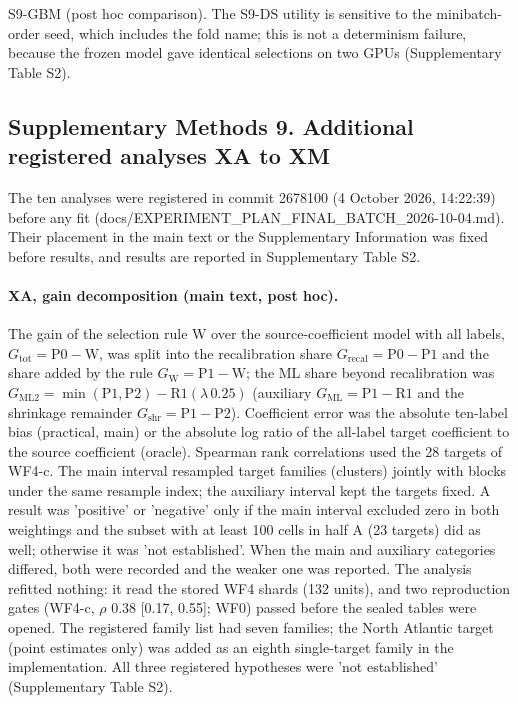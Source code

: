 S9-GBM (post hoc comparison). The S9-DS utility is sensitive to the minibatch-order seed, which includes the fold name; this is not a determinism failure, because the frozen model gave identical selections on two GPUs (Supplementary Table S2).

\subsection*{Supplementary Methods 9. Additional registered analyses XA to XM}

The ten analyses were registered in commit 2678100 (4 October 2026, 14:22:39) before any fit (docs/EXPERIMENT\_PLAN\_FINAL\_BATCH\_2026-10-04.md). Their placement in the main text or the Supplementary Information was fixed before results, and results are reported in Supplementary Table S2.

\paragraph*{XA, gain decomposition (main text, post hoc).} The gain of the selection rule W over the source-coefficient model with all labels, $G_{\mathrm{tot}} = \mathrm{P0} - \mathrm{W}$, was split into the recalibration share $G_{\mathrm{recal}} = \mathrm{P0} - \mathrm{P1}$ and the share added by the rule $G_{\mathrm{W}} = \mathrm{P1} - \mathrm{W}$; the ML share beyond recalibration was $G_{\mathrm{ML2}} = \min(\mathrm{P1}, \mathrm{P2}) - \mathrm{R1}(\lambda\,0.25)$ (auxiliary $G_{\mathrm{ML}} = \mathrm{P1} - \mathrm{R1}$ and the shrinkage remainder $G_{\mathrm{shr}} = \mathrm{P1} - \mathrm{P2}$). Coefficient error was the absolute ten-label bias (practical, main) or the absolute log ratio of the all-label target coefficient to the source coefficient (oracle). Spearman rank correlations used the 28 targets of WF4-c. The main interval resampled target families (clusters) jointly with blocks under the same resample index; the auxiliary interval kept the targets fixed. A result was 'positive' or 'negative' only if the main interval excluded zero in both weightings and the subset with at least 100 cells in half A (23 targets) did as well; otherwise it was 'not established'. When the main and auxiliary categories differed, both were recorded and the weaker one was reported. The analysis refitted nothing: it read the stored WF4 shards (132 units), and two reproduction gates (WF4-c, $\rho$ 0.38 [0.17, 0.55]; WF0) passed before the sealed tables were opened. The registered family list had seven families; the North Atlantic target (point estimates only) was added as an eighth single-target family in the implementation. All three registered hypotheses were 'not established' (Supplementary Table S2).

